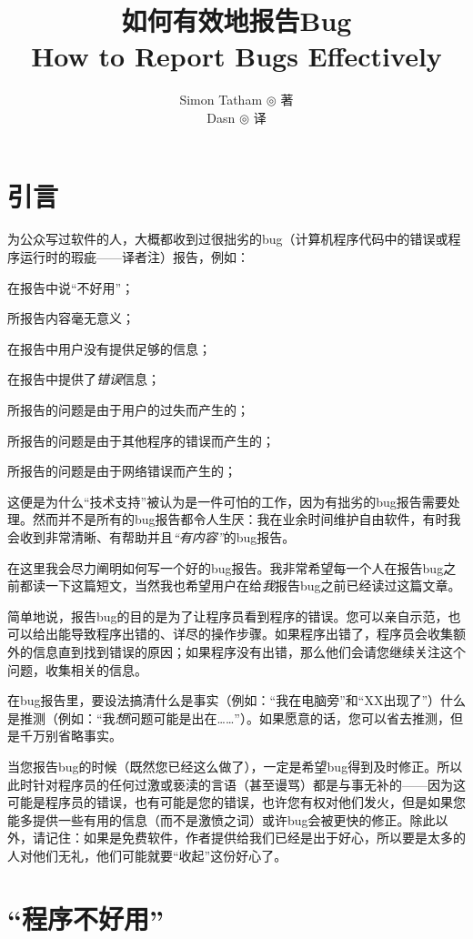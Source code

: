 \documentclass[titlepage]{article}
\title{\textbf{如何有效地报告Bug\\\normalsize How to Report Bugs Effectively}}
\author{Simon Tatham $ \circledcirc $ 著\\Dasn $ \circledcirc $ 译}
\date{一九九九年\\[10em]\parbox{\linewidth}{版权所有 Simon Tatham 1999\\
		本文属于\href{https://www.opencontent.org/}{OPL（OpenContent License）}，请在复制和使用本文时自觉遵守OPL。\\		
		对本文的任何意见和批评请发送至：\\	
		英文版：\href{mailto:anakin@pobox.com}{anakin@pobox.com}\\	
		中文版：\href{dasn@users.sf.net}{dasn@users.sf.net}}}
\begin{document}
\maketitle

\tableofcontents\newpage

\section{{引言}}

 为公众写过软件的人，大概都收到过很拙劣的bug（计算机程序代码中的错误或程序运行时的瑕疵——译者注）报告，例如：


在报告中说“不好用”；

所报告内容毫无意义；

在报告中用户没有提供足够的信息；

在报告中提供了\emph{错误}信息；

所报告的问题是由于用户的过失而产生的；

所报告的问题是由于其他程序的错误而产生的；

所报告的问题是由于网络错误而产生的；

这便是为什么“技术支持”被认为是一件可怕的工作，因为有拙劣的bug报告需要处理。然而并不是所有的bug报告都令人生厌：我在业余时间维护自由软件，有时我会收到非常清晰、有帮助并且\emph{“有内容”}的bug报告。

在这里我会尽力阐明如何写一个好的bug报告。我非常希望每一个人在报告bug之前都读一下这篇短文，当然我也希望用户在给\emph{我}报告bug之前已经读过这篇文章。

简单地说，报告bug的目的是为了让程序员看到程序的错误。您可以亲自示范，也可以给出能导致程序出错的、详尽的操作步骤。如果程序出错了，程序员会收集额外的信息直到找到错误的原因；如果程序没有出错，那么他们会请您继续关注这个问题，收集相关的信息。

在bug报告里，要设法搞清什么是事实（例如：“我在电脑旁”和“XX出现了”）什么是推测（例如：“我\emph{想}问题可能是出在……”）。如果愿意的话，您可以省去推测，但是千万别省略事实。

当您报告bug的时候（既然您已经这么做了），一定是希望bug得到及时修正。所以此时针对程序员的任何过激或亵渎的言语（甚至谩骂）都是与事无补的——因为这可能是程序员的错误，也有可能是您的错误，也许您有权对他们发火，但是如果您能多提供一些有用的信息（而不是激愤之词）或许bug会被更快的修正。除此以外，请记住：如果是免费软件，作者提供给我们已经是出于好心，所以要是太多的人对他们无礼，他们可能就要“收起”这份好心了。

\section{{“程序不好用”}}
\end{document}
